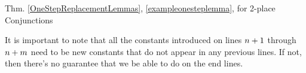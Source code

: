 \begin{PROOFOF}{Thm. \ref{OneStepReplacementLemmas}, \ref{exampleonesteplemma}, for 2-place Conjunctions}
\begin{gproofnn}
\gline{$\integer{q}+14$}{$\forall[{\parconjunction{\CAPPHI}{\CAPPSI}}\TRIPLEBAR$}{ }
\glinend{}{$\qquad{\parconjunction{\CAPPHI^*}{\CAPPSI}]\constant{c_{\integer{1}}}\ldots\constant{c_{\integer{\integer{m}-1}}}/\variable{x}_1\ldots\variable{x}_{\integer{m}-1}}$}{\Rule{$\forall$-Intro}, $\integer{q}+13$}

\glinend{ }{$\qquad\vdots$}{ }


\end{gproofnn}
\noindent{}It is important to note that all the constants introduced on lines $n+1$ through $n+m$ need to be new constants that do not appear in any previous lines. 
If not, then there's no guarantee that we be able to do  on the end lines. 
\end{PROOFOF}

